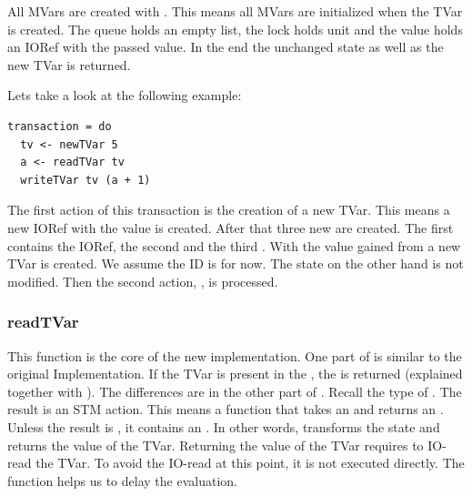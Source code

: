 All MVars are created with . This means all MVars are initialized when the TVar is created.
The queue holds an empty list, the lock holds unit and the value holds an IORef with the passed value.
In the end the unchanged state as well as the new TVar is returned.

Lets take a look at the following example:
\begin{lstlisting}
transaction = do 
  tv <- newTVar 5
  a <- readTVar tv
  writeTVar tv (a + 1)
\end{lstlisting}
The first action of this transaction is the creation of a new TVar. This means a new IORef with 
the value  is created. After that three new  are created. The first contains the 
IORef, the second \code{[]} and the third \code{()}. With the value gained from 
 a new TVar is created. We assume the ID is  for now. 
The state on the other hand is not modified. Then the 
second action, , is processed.


\subsubsection{readTVar}
This function is the core of the new implementation. One part of  is similar to the original 
Implementation. If the TVar is present in the , the  is returned (explained together with ).
The differences are in the other part of . Recall the type of .
The result is an STM action. This means a function that takes an  and returns an . 
Unless the result is , it contains an . In other words,  transforms
the state and returns the value of the TVar. Returning the value of the TVar requires to IO-read the
TVar. To avoid the IO-read at this point, it is not executed directly. The function  helps us 
to delay the evaluation.

